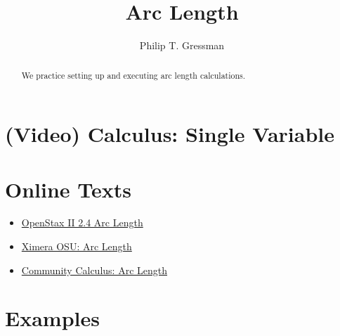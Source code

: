 \documentclass{ximera}
\title{Arc Length}
\author{Philip T. Gressman}
\begin{document}
\begin{abstract}
We practice setting up and executing arc length calculations.
\end{abstract}
\maketitle

\section*{(Video) Calculus: Single Variable}

\section*{Online Texts}
\begin{itemize}
\item \href{https://openstax.org/books/calculus-volume-2/pages/2-4-arc-length-of-a-curve-and-surface-area}{OpenStax II 2.4 Arc Length}
\item \href{https://ximera.osu.edu/mooculus/calculus2/lengthOfCurves/titlePage}{Ximera OSU: Arc Length}
\item \href{https://www.whitman.edu/mathematics/calculus_online/section09.09.html}{Community Calculus: Arc Length}
\end{itemize}


\section*{Examples}
\end{document}
